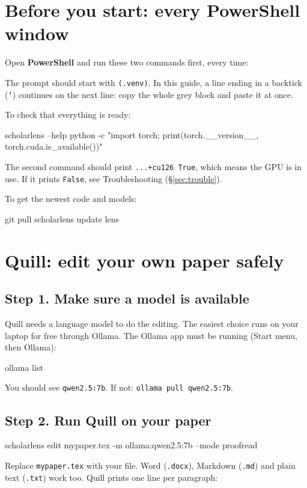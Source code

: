 \documentclass[11pt]{article}
\newcommand{\cm}[1]{\texttt{#1}}
\begin{document}
\section{Before you start: every PowerShell window}

Open \textbf{PowerShell} and run these two commands first, every time:
The prompt should start with \cm{(.venv)}. In this guide, a line ending in a backtick (\cm{`}) continues on the next line: copy the whole grey block and paste it at once.

To check that everything is ready:
\begin{cmd}
scholarlens --help
python -c "import torch; print(torch.__version__, torch.cuda.is_available())"
\end{cmd}
The second command should print \cm{...+cu126 True}, which means the GPU is in use. If it prints \cm{False}, see Troubleshooting (\S\ref{sec:trouble}).

To get the newest code and models:
\begin{cmd}
git pull
scholarlens update lens
\end{cmd}

\section{Quill: edit your own paper safely}

\subsection*{Step 1. Make sure a model is available}
Quill needs a language model to do the editing. The easiest choice runs on your laptop for free through Ollama.
The Ollama app must be running (Start menu, then Ollama):
\begin{cmd}
ollama list
\end{cmd}
You should see \cm{qwen2.5:7b}. If not: \cm{ollama pull qwen2.5:7b}.

\subsection*{Step 2. Run Quill on your paper}
\begin{cmd}
scholarlens edit mypaper.tex -m ollama:qwen2.5:7b --mode proofread
\end{cmd}
Replace \cm{mypaper.tex} with your file. Word (\cm{.docx}), Markdown (\cm{.md}) and plain text (\cm{.txt}) work too.
Quill prints one line per paragraph:
\end{document}
